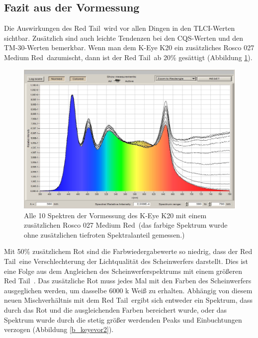 \subsection{Fazit aus der Vormessung}
\label{sec_vmfazit}
Die Auswirkungen des \glqq Red Tail\grqq\ wird vor allen Dingen in den TLCI-Werten sichtbar. Zusätzlich sind auch leichte Tendenzen bei den CQS-Werten und den TM-30-Werten bemerkbar.
Wenn man dem K-Eye K20 ein zusätzliches Rosco 027 \glqq Medium Red\grqq\ dazumischt, dann ist der \glqq Red Tail\grqq\ ab 20\% gesättigt (Abbildung \ref{b_keyevor1}). 

\begin{figure}[H]     %
\centering
\includegraphics[width=1.0\textwidth]{bilder/keyevor1} 
\caption {Alle 10 Spektren der Vormessung des K-Eye K20 mit einem zusätzlichen  Rosco 027 \glqq Medium Red\grqq\ (das farbige Spektrum wurde ohne zusätzlichen tiefroten Spektralanteil gemessen.)}\label{b_keyevor1}
\end{figure}

Mit 50\% zusätzlichem Rot sind die Farbwiedergabewerte so niedrig, dass der \glqq Red Tail\grqq\ eine Verschlechterung der Lichtqualität des Scheinwerfers darstellt. Dies ist eine Folge aus dem Angleichen des Scheinwerferspektrums mit einem größeren \glqq Red Tail\grqq\ .
Das zusätzliche Rot muss jedes Mal mit den Farben des Scheinwerfers ausgeglichen werden, um dasselbe 6000 k Weiß zu erhalten. Abhängig von diesem neuen Mischverhältnis mit dem \glqq Red Tail\grqq\ ergibt sich entweder ein Spektrum, dass durch das Rot und die ausgleichenden Farben bereichert wurde, oder das Spektrum wurde durch die stetig größer werdenden Peaks und Einbuchtungen verzogen (Abbildung \ref{b_keyevor2}).


